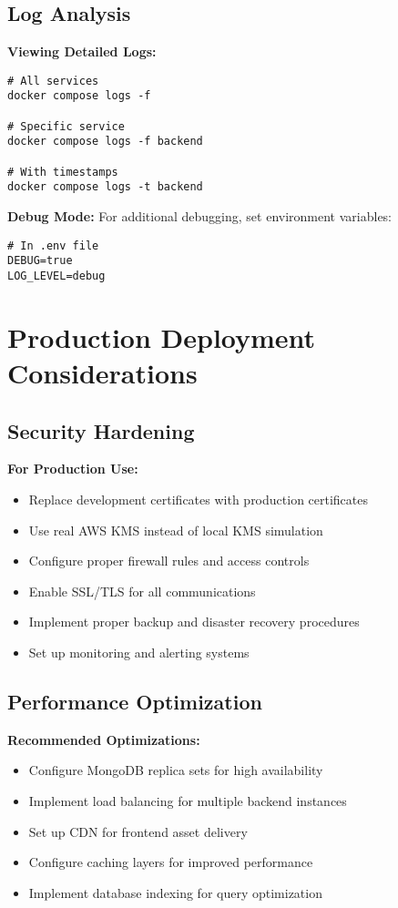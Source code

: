\subsection{Log Analysis}

\textbf{Viewing Detailed Logs:}
\begin{verbatim}
# All services
docker compose logs -f

# Specific service
docker compose logs -f backend

# With timestamps
docker compose logs -t backend
\end{verbatim}

\textbf{Debug Mode:}
For additional debugging, set environment variables:
\begin{verbatim}
# In .env file
DEBUG=true
LOG_LEVEL=debug
\end{verbatim}

\section{Production Deployment Considerations}

\subsection{Security Hardening}

\textbf{For Production Use:}
\begin{itemize}
    \item Replace development certificates with production certificates
    \item Use real AWS KMS instead of local KMS simulation
    \item Configure proper firewall rules and access controls
    \item Enable SSL/TLS for all communications
    \item Implement proper backup and disaster recovery procedures
    \item Set up monitoring and alerting systems
\end{itemize}

\subsection{Performance Optimization}

\textbf{Recommended Optimizations:}
\begin{itemize}
    \item Configure MongoDB replica sets for high availability
    \item Implement load balancing for multiple backend instances
    \item Set up CDN for frontend asset delivery
    \item Configure caching layers for improved performance
    \item Implement database indexing for query optimization
\end{itemize}

